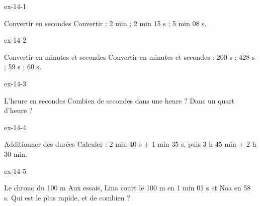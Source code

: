 \clearpage{}
\begin{blocLivre}{ex-14-1}\begin{exercice}[1]{Convertir en secondes}
Convertir : 2 min ; 2 min 15 s ; 5 min 08 s.
\end{exercice}\end{blocLivre}
\begin{blocLivre}{ex-14-2}\begin{exercice}[1]{Convertir en minutes et secondes}
Convertir en minutes et secondes : 200 s ; 428 s ; 59 s ; 60 s.
\end{exercice}\end{blocLivre}
\begin{blocLivre}{ex-14-3}\begin{exercice}[1]{L’heure en secondes}
Combien de secondes dans une heure ? Dans un quart d’heure ?
\end{exercice}\end{blocLivre}
\begin{blocLivre}{ex-14-4}\begin{exercice}[1]{Additionner des durées}
Calculer : 2 min 40 s $+$ 1 min 35 s, puis 3 h 45 min $+$ 2 h 30 min.
\end{exercice}\end{blocLivre}
\begin{blocLivre}{ex-14-5}\begin{exercice}[1]{Le chrono du 100 m}
Aux essais, Lina court le 100 m en 1 min 01 s et Noa en 58 s. Qui est le plus rapide, et de combien ?
\end{exercice}\end{blocLivre}

